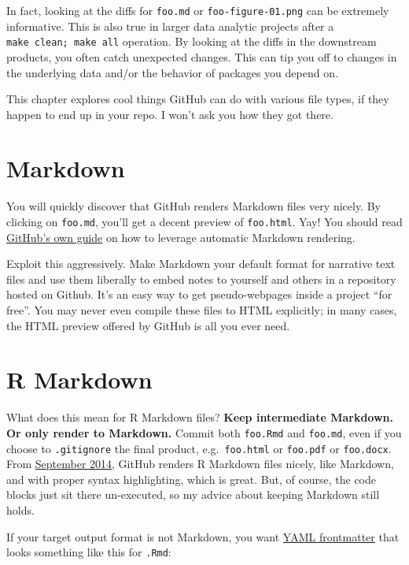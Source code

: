 \documentclass[
]{book}
\begin{document}
In fact, looking at the diffs for \texttt{foo.md} or \texttt{foo-figure-01.png} can be extremely informative. This is also true in larger data analytic projects after a \texttt{make\ clean;\ make\ all} operation. By looking at the diffs in the downstream products, you often catch unexpected changes. This can tip you off to changes in the underlying data and/or the behavior of packages you depend on.

This chapter explores cool things GitHub can do with various file types, if they happen to end up in your repo. I won't ask you how they got there.

\section{Markdown}\label{markdown}

You will quickly discover that GitHub renders Markdown files very nicely. By clicking on \texttt{foo.md}, you'll get a decent preview of \texttt{foo.html}. Yay! You should read \href{https://guides.github.com/features/mastering-markdown/}{GitHub's own guide} on how to leverage automatic Markdown rendering.

Exploit this aggressively. Make Markdown your default format for narrative text files and use them liberally to embed notes to yourself and others in a repository hosted on Github. It's an easy way to get pseudo-webpages inside a project ``for free''. You may never even compile these files to HTML explicitly; in many cases, the HTML preview offered by GitHub is all you ever need.

\section{R Markdown}\label{r-markdown}

What does this mean for R Markdown files? \textbf{Keep intermediate Markdown. Or only render to Markdown.} Commit both \texttt{foo.Rmd} and \texttt{foo.md}, even if you choose to \texttt{.gitignore} the final product, e.g.~\texttt{foo.html} or \texttt{foo.pdf} or \texttt{foo.docx}. From \href{https://github.com/github/markup/pull/343}{September 2014}, GitHub renders R Markdown files nicely, like Markdown, and with proper syntax highlighting, which is great. But, of course, the code blocks just sit there un-executed, so my advice about keeping Markdown still holds.

If your target output format is not Markdown, you want \href{https://gist.github.com/jennybc/402761e30b9be8023af9}{YAML frontmatter} that looks something like this for \texttt{.Rmd}:
\end{document}

